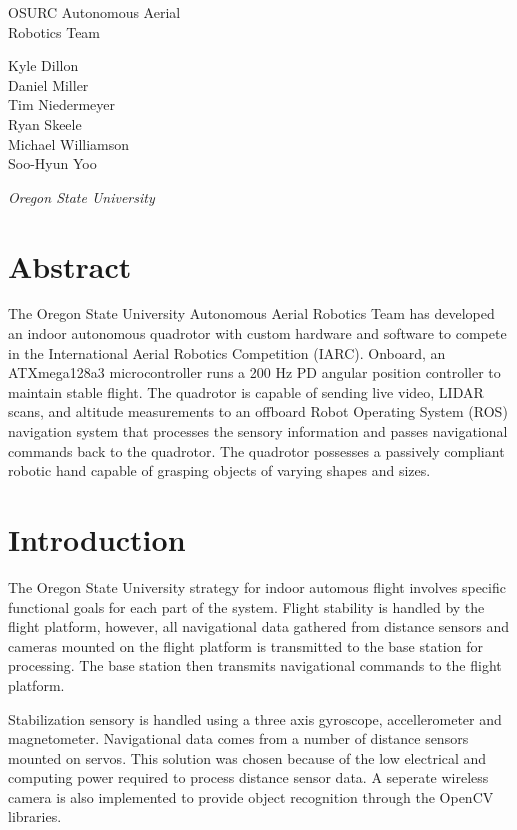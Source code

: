 \documentclass[12pt,letterpaper]{article}
\begin{document}
\begin{center}
{\huge
    OSURC Autonomous Aerial \\ Robotics Team\\[1cm]
}
{
Kyle Dillon \\
Daniel Miller \\
Tim Niedermeyer \\
Ryan Skeele \\
Michael Williamson \\
Soo-Hyun Yoo \\ \vspace{0.5em}

\emph{Oregon State University}
}

\end{center}

\section*{Abstract}

The Oregon State University Autonomous Aerial Robotics Team has developed
an indoor autonomous quadrotor with custom hardware and software to compete
in the International Aerial Robotics Competition (IARC). Onboard, an
ATXmega128a3 microcontroller runs a 200 Hz PD angular position controller
to maintain stable flight. The quadrotor is capable of sending live video,
LIDAR scans, and altitude measurements to an offboard Robot Operating
System (ROS) navigation system that processes the sensory information and
passes navigational commands back to the quadrotor. The quadrotor possesses
a passively compliant robotic hand capable of grasping objects of varying
shapes and sizes.


\section*{Introduction}

The Oregon State University strategy for indoor automous flight involves
specific functional goals for each part of the system. Flight stability is
handled by the flight platform, however, all navigational data gathered from
distance sensors and cameras mounted on the flight platform is transmitted to
the base station for processing. The base station then transmits navigational
commands to the flight platform.

Stabilization sensory is handled using a three axis gyroscope, 
accellerometer and magnetometer. Navigational data comes from a number of
distance sensors mounted on servos. This solution was chosen because of the
low electrical and computing power required to process distance sensor data.
A seperate wireless camera is also implemented to provide object recognition
through the OpenCV libraries.
\end{document}
